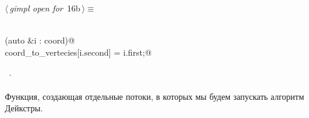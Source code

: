 \documentclass[12pt]{article}
\begin{document}
\begin{flushleft} \small
\begin{minipage}{\linewidth}\label{scrap26}\raggedright\small
{} $\langle\,${\itshape gimpl open for}\nobreak\ {\footnotesize {16b}}$\,\rangle\equiv$
\vspace{-1ex}
\begin{list}{}{} \item
\mbox{}\verb@@\\
\mbox{}\verb@for (auto &i : coord)@\\
\mbox{}\verb@    coord_to_vertecies[i.second] = i.first;@\\
\mbox{}\verb@@{\NWsep}
\end{list}
\vspace{-1.5ex}
\footnotesize
\begin{list}{}{\setlength{\itemsep}{-\parsep}\setlength{\itemindent}{-\leftmargin}}
\item \NWtxtMacroRefIn\ .

\item{}
\end{list}
\end{minipage}\vspace{4ex}
\end{flushleft}
\paragraph{}
Функция, создающая отдельные потоки, в которых мы будем запускать алгоритм Дейкстры.
\end{document}
